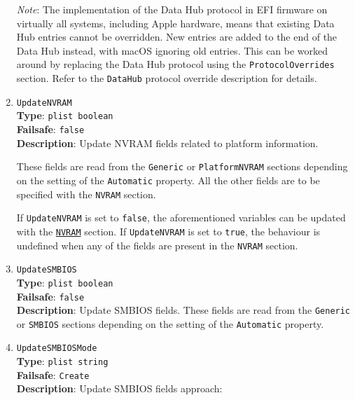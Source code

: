 \documentclass[]{article}
\begin{document}
\begin{enumerate}
  \emph{Note}: The implementation of the Data Hub protocol in EFI firmware on
  virtually all systems, including Apple hardware, means that existing Data Hub
  entries cannot be overridden. New entries are added to the end of the Data Hub
  instead, with macOS ignoring old entries. This can be worked around by
  replacing the Data Hub protocol using the \texttt{ProtocolOverrides} section.
  Refer to the \texttt{DataHub} protocol override description for details.
\item
  \texttt{UpdateNVRAM}\\
  \textbf{Type}: \texttt{plist\ boolean}\\
  \textbf{Failsafe}: \texttt{false}\\
  \textbf{Description}: Update NVRAM fields related to platform information.

  These fields are read from the \texttt{Generic} or \texttt{PlatformNVRAM}
  sections depending on the setting of the \texttt{Automatic} property.
  All the other fields are to be specified with the \texttt{NVRAM} section.

  If \texttt{UpdateNVRAM} is set to \texttt{false}, the aforementioned
  variables can be updated with the \hyperref[nvram]{\texttt{NVRAM}}
  section. If \texttt{UpdateNVRAM} is set to \texttt{true}, the behaviour is
  undefined when any of the fields are present in the \texttt{NVRAM} section.
\item
  \texttt{UpdateSMBIOS}\\
  \textbf{Type}: \texttt{plist\ boolean}\\
  \textbf{Failsafe}: \texttt{false}\\
  \textbf{Description}: Update SMBIOS fields. These fields are read from the
  \texttt{Generic} or \texttt{SMBIOS} sections depending on
  the setting of the \texttt{Automatic} property.
\item
  \texttt{UpdateSMBIOSMode}\\
  \textbf{Type}: \texttt{plist\ string}\\
  \textbf{Failsafe}: \texttt{Create}\\
  \textbf{Description}: Update SMBIOS fields approach:


\end{enumerate}
\end{document}
